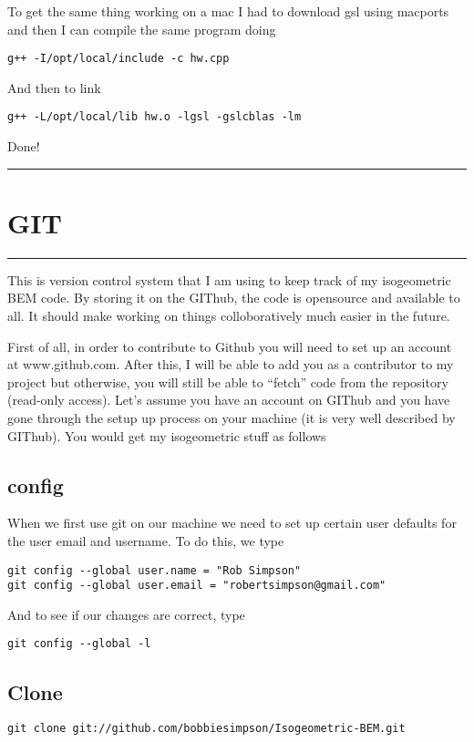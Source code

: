 \documentclass[a4paper, 10pt]{article}
\newcommand{\mytoprule}{\hrule\vspace{4mm}}
\newcommand{\mybotrule}{\vspace{4mm}\hrule}
\begin{document}
To get the same thing working on a mac I had to download gsl using macports and then I can compile the same program doing
\begin{Verbatim}
g++ -I/opt/local/include -c hw.cpp
\end{Verbatim}
And then to link
\begin{Verbatim}
g++ -L/opt/local/lib hw.o -lgsl -gslcblas -lm
\end{Verbatim}
Done!
\mybotrule

%

\vspace{10mm}
\section*{GIT}
\mytoprule

This is version control system that I am using to keep track of my isogeometric BEM code. By storing it on the GIThub, the code is opensource and available to all. It should make working on things colloboratively much easier in the future. 

First of all, in order to contribute to Github you will need to set up an account at www.github.com. After this, I will be able to add you as a contributor to my project but otherwise, you will still be able to ``fetch'' code from the repository (read-only access). Let's assume you have an account on GIThub and you have gone through the setup up process on your machine (it is very well described by GIThub). You would get my isogeometric stuff as follows

\subsection*{config}
\label{sec:config}

When we first use git on our machine we need to set up certain user
defaults for the user email and username. To do this, we type
\begin{verbatim}
git config --global user.name = "Rob Simpson"
git config --global user.email = "robertsimpson@gmail.com"
\end{verbatim}
And to see if our changes are correct, type
\begin{verbatim}
git config --global -l
\end{verbatim}

\subsection*{Clone}
\begin{Verbatim}
git clone git://github.com/bobbiesimpson/Isogeometric-BEM.git
\end{Verbatim}
\end{document}
